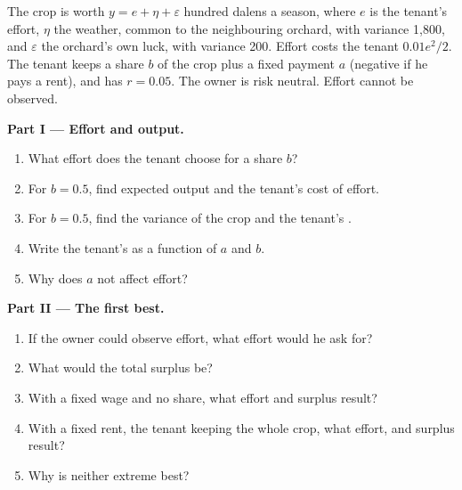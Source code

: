 \begin{problem}
\label{pb:b2:moral-hazard:1}
The crop is worth $y = e + \eta + \varepsilon$ hundred dalens a season, where $e$ is the tenant's effort, $\eta$ the weather, common to the
neighbouring orchard, with variance 1{,}800, and $\varepsilon$ the orchard's own luck, with variance 200. Effort costs the tenant $0.01e^2/2$. The
tenant keeps a share $b$ of the crop plus a fixed payment $a$ (negative if he pays a rent), and has  $r = 0.05$. The owner is risk neutral. Effort cannot be observed.

\medskip
\noindent\textbf{Part I --- Effort and output.}
\begin{enumerate}
  \item What effort does the tenant choose for a share $b$?
  \item For $b = 0.5$, find expected output and the tenant's cost of effort.
  \item For $b = 0.5$, find the variance of the crop and the tenant's .
  \item Write the tenant's  as a function of $a$ and $b$.
  \item Why does $a$ not affect effort?
\end{enumerate}

\medskip
\noindent\textbf{Part II --- The first best.}
\begin{enumerate}[resume]
  \item If the owner could observe effort, what effort would he ask for?
  \item What would the total surplus be?
  \item With a fixed wage and no share, what effort and surplus result?
  \item With a fixed rent, the tenant keeping the whole crop, what effort,  and surplus result?
  \item Why is neither extreme best?
\end{enumerate}


\end{problem}
